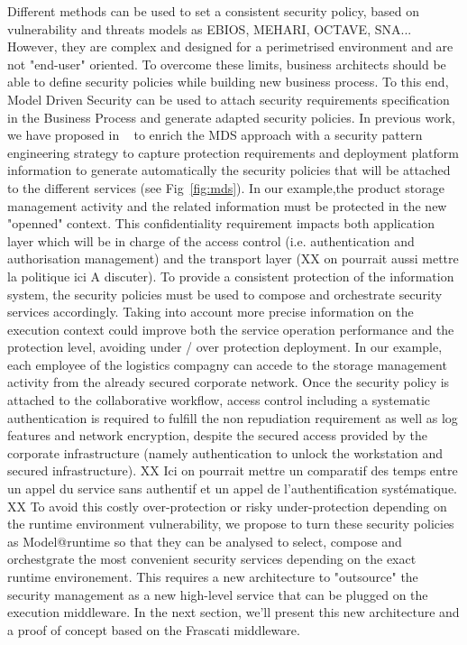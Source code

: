 \documentclass[runningheads,a4paper]{llncs}
\begin{document}
Different methods can be used to set a consistent security policy, based on vulnerability and threats models as EBIOS, MEHARI, OCTAVE, SNA... However, they are complex and designed for a perimetrised environment and are not "end-user" oriented. To overcome these limits, business architects should be able to define security policies while building new business process. To this end, Model Driven Security can be used to attach security requirements specification in the Business Process and generate adapted security policies. In previous work, we have proposed in ~\cite{OBG12} to enrich the MDS approach with a security pattern engineering strategy to capture protection requirements and deployment platform information to generate automatically the security policies that will be attached to the different services (see Fig~\ref{fig:mds}).
In our example,the product storage management activity and the related information must be protected in the new "openned" context. This confidentiality requirement impacts both application layer which will be in charge of the access control (i.e. authentication and authorisation management) and the transport layer (XX on pourrait aussi mettre la politique ici A discuter). 
To provide a consistent protection of the information system, the security policies must be used to compose and orchestrate security services accordingly. Taking into account more precise information on the execution context could improve both the service operation performance and the protection level, avoiding under / over protection deployment. In our example, each employee of the logistics compagny can accede to the storage management activity from the already secured corporate network. Once the security policy is attached to the collaborative workflow, access control including a systematic authentication is required to fulfill the non repudiation requirement as well as log features and network encryption, despite the secured access provided by the corporate infrastructure (namely authentication to unlock the workstation and secured infrastructure).
XX Ici on pourrait mettre un comparatif des temps entre un appel du service sans authentif et un appel de l'authentification syst\'ematique. XX
To avoid this costly over-protection or risky under-protection depending on the runtime environment vulnerability, we propose to turn these security policies as Model@runtime so that they can be analysed to select, compose and orchestgrate the most convenient security services depending on the exact runtime environement. This requires a new architecture to "outsource" the security management as a new high-level service that can be plugged on the execution middleware. In the next section, we'll present this new architecture and a proof of concept based on the Frascati middleware.
\end{document}
